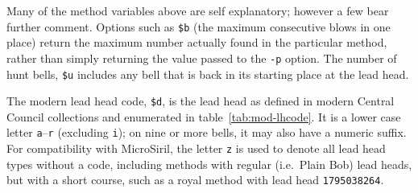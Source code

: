\documentclass[a4paper,11pt,oneside]{book}
\makeatletter
\newcommand{\fspec}[1]{\index{#1@{\hspace*{-\fspecwidth}\texttt{\$#1}}}}
\makeatother
\begin{document}
Many of the method variables above are self explanatory; however a few
bear further comment.  Options such as \verb+$b+\fspec{b} (the maximum
consecutive blows in one place) return the maximum number actually found
in the particular method, rather than simply returning the value passed
to the \verb+-p+ option.  The number of hunt bells, \verb+$u+\fspec{u} 
includes any bell that is back in its starting place at the lead head.

The modern lead head code, \verb+$d+\fspec{d}, is the lead head as defined
in modern Central Council collections and enumerated in 
table~\ref{tab:mod-lhcode}.
It is a lower case letter \verb+a+--\verb+r+ (excluding \verb+i+); 
on nine or more bells, it may also have a numeric suffix.  For compatibility
with MicroSiril, the letter \verb+z+ is used
to denote all lead head types without a code, including methods with regular
(i.e.\ Plain Bob) lead heads, but with a short course, such as a royal
method with lead head \verb+1795038264+.
\end{document}
